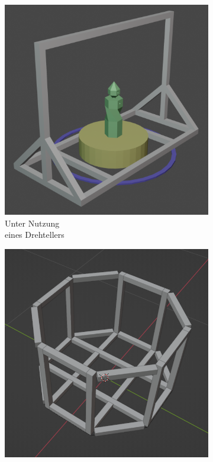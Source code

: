 \documentclass[./00PhotoBox.tex]{subfiles}
\begin{document}
\begin{figure}
    \centering
    \begin{subfigure}{0.30\textwidth}
        \includegraphics[height=1\linewidth]{./img/3_aufbau/modell1.png}
        \centering
        \caption{Unter Nutzung\\eines Drehtellers}
        \label{img:entwurf1}
    \end{subfigure}
    \begin{subfigure}{0.30\textwidth}
        \includegraphics[height=1\linewidth]{./img/3_aufbau/modell2.png}

\end{subfigure}
\end{figure}
\end{document}
